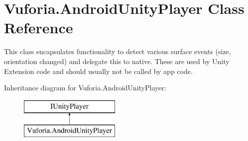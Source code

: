 \hypertarget{class_vuforia_1_1_android_unity_player}{}\section{Vuforia.\+Android\+Unity\+Player Class Reference}
\label{class_vuforia_1_1_android_unity_player}


This class encapsulates functionality to detect various surface events (size, orientation changed) and delegate this to native. These are used by Unity Extension code and should usually not be called by app code.  


Inheritance diagram for Vuforia.\+Android\+Unity\+Player\+:\begin{figure}[H]
\begin{center}
\leavevmode
\includegraphics[height=2.000000cm]{class_vuforia_1_1_android_unity_player}
\end{center}
\end{figure}

